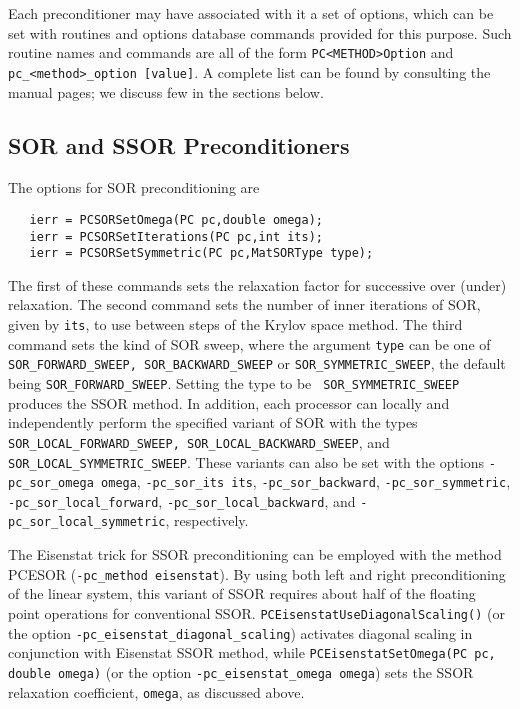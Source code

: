 Each preconditioner may have associated with it a set of options,
which can be set with routines and options database commands provided
for this purpose.  Such routine names and commands are all of the form
{\tt PC<METHOD>Option} and {\tt pc\_<method>\_option [value]}.  A
complete list can be found by consulting the manual pages; we discuss
few in the sections below.

\subsection{SOR and SSOR Preconditioners}

The options for SOR   
preconditioning are 
\begin{verbatim}
   ierr = PCSORSetOmega(PC pc,double omega);
   ierr = PCSORSetIterations(PC pc,int its);
   ierr = PCSORSetSymmetric(PC pc,MatSORType type);
\end{verbatim}
The  
first of these commands sets the relaxation factor for successive
over (under) relaxation.  The second command sets the number of inner
iterations of SOR, given by {\tt its}, to use between steps of the
Krylov space method.  The third command sets the kind of SOR sweep,
where the argument {\tt type} can be one of {\tt SOR\_FORWARD\_SWEEP,
SOR\_BACKWARD\_SWEEP} or {\tt SOR\_SYMMETRIC\_SWEEP}, the default
being {\tt SOR\_FORWARD\_SWEEP}. Setting the type to be {\tt
SOR\_SYMMETRIC\_SWEEP} produces the SSOR method.  In addition, 
each processor can locally and independently perform the specified 
variant of SOR with the types {\tt SOR\_LOCAL\_FORWARD\_SWEEP, 
SOR\_LOCAL\_BACKWARD\_SWEEP}, and {\tt SOR\_LOCAL\_SYMMETRIC\_SWEEP}.
These  
variants  
can  
also be set with the  
 
 
 options {\tt -pc\_sor\_omega omega}, 
{\tt -pc\_sor\_its its}, {\tt -pc\_sor\_backward}, {\tt -pc\_sor\_symmetric}, 
{\tt -pc\_sor\_local\_forward}, {\tt -pc\_sor\_local\_backward}, and 
{\tt -pc\_sor\_local\_symmetric}, respectively.

The Eisenstat trick  for SSOR preconditioning 
can be employed with the method PCESOR  
({\tt -pc\_method eisenstat}).  
By using both left and right preconditioning of the linear system,
this variant of SSOR requires about half of the floating point operations 
for conventional SSOR.  {\tt PCEisenstatUseDiagonalScaling()} (or the
option {\tt -pc\_eisenstat\_diagonal\_scaling}) 
 activates diagonal
scaling in conjunction with Eisenstat SSOR method, while
{\tt PCEisenstatSetOmega(PC pc, double omega)} 
 (or the 
option {\tt -pc\_eisenstat\_omega omega}) 
sets the SSOR relaxation coefficient, {\tt omega}, as discussed above.

